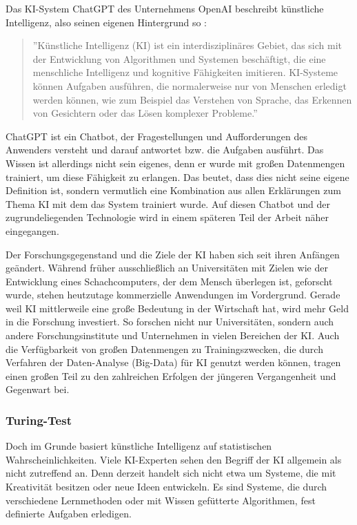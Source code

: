 \documentclass[a4paper,12pt, german]{report}
\begin{document}
Das KI-System ChatGPT des Unternehmens OpenAI beschreibt künstliche Intelligenz, also seinen eigenen Hintergrund so \cite{04}:
\begin{quote}
  ''Künstliche Intelligenz (KI) ist ein interdisziplinäres Gebiet, das sich mit der Entwicklung von Algorithmen und Systemen beschäftigt, die eine menschliche Intelligenz und kognitive Fähigkeiten imitieren. KI-Systeme können Aufgaben ausführen, die normalerweise nur von Menschen erledigt werden können, wie zum Beispiel das Verstehen von Sprache, das Erkennen von Gesichtern oder das Lösen komplexer Probleme.''
\end{quote}
ChatGPT ist ein Chatbot, der Fragestellungen und Aufforderungen des Anwenders versteht und darauf antwortet bzw. die Aufgaben ausführt. Das Wissen ist allerdings nicht sein eigenes, denn er wurde mit großen Datenmengen trainiert, um diese Fähigkeit zu erlangen. Das beutet, dass dies nicht seine eigene Definition ist, sondern vermutlich eine Kombination aus allen Erklärungen zum Thema KI mit dem das System trainiert wurde. Auf diesen Chatbot und der zugrundeliegenden Technologie wird in einem späteren Teil der Arbeit näher eingegangen.

Der Forschungsgegenstand und die Ziele der KI haben sich seit ihren Anfängen geändert. Während früher ausschließlich an Universitäten mit Zielen wie der Entwicklung eines Schachcomputers, der dem Mensch überlegen ist, geforscht wurde, stehen heutzutage kommerzielle Anwendungen im Vordergrund. 
Gerade weil KI mittlerweile eine große Bedeutung in der Wirtschaft hat, wird mehr Geld in die Forschung investiert. So forschen nicht nur Universitäten, sondern auch andere Forschungsinstitute und Unternehmen in vielen Bereichen der KI. Auch die Verfügbarkeit von großen Datenmengen zu Trainingszwecken, die durch Verfahren der Daten-Analyse (Big-Data) für KI genutzt werden können, tragen einen großen Teil zu den zahlreichen Erfolgen der jüngeren Vergangenheit und Gegenwart bei. \cite{10}


\subsubsection{Turing-Test}

Doch im Grunde basiert künstliche Intelligenz auf statistischen Wahrscheinlichkeiten. Viele KI-Experten sehen den Begriff der KI allgemein als nicht zutreffend an. Denn derzeit handelt sich nicht etwa um Systeme, die mit Kreativität besitzen oder neue Ideen entwickeln. Es sind Systeme, die durch verschiedene Lernmethoden oder mit Wissen gefütterte Algorithmen, fest definierte Aufgaben erledigen. 
\end{document}

